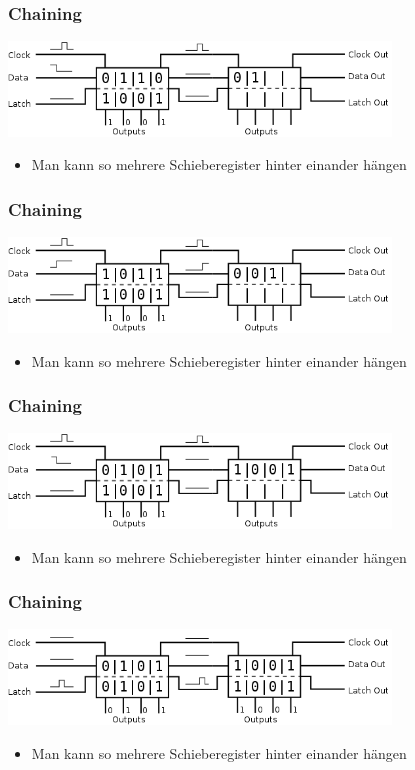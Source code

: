 \documentclass[ngerman,compress]{beamer}
\begin{document}
\begin{frame} [fragile]
	\frametitle{Chaining}
	\includegraphics[width=4in]{12_chaining.png}
	\begin{itemize}
		\item Man kann so mehrere Schieberegister hinter einander hängen
	\end{itemize}
\end{frame}

\begin{frame} [fragile]
	\frametitle{Chaining}
	\includegraphics[width=4in]{13_chaining.png}
	\begin{itemize}
		\item Man kann so mehrere Schieberegister hinter einander hängen
	\end{itemize}
\end{frame}

\begin{frame} [fragile]
	\frametitle{Chaining}
	\includegraphics[width=4in]{14_chaining.png}
	\begin{itemize}
		\item Man kann so mehrere Schieberegister hinter einander hängen
	\end{itemize}
\end{frame}

\begin{frame} [fragile]
	\frametitle{Chaining}
	\includegraphics[width=4in]{15_latch.png}
	\begin{itemize}
		\item Man kann so mehrere Schieberegister hinter einander hängen
	\end{itemize}
\end{frame}
\end{document}
